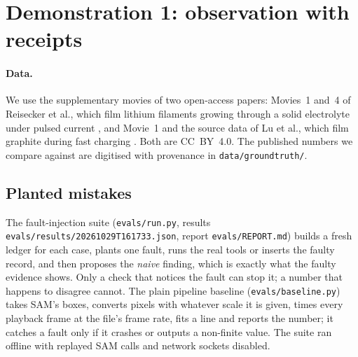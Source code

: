\documentclass[11pt]{article}
\newcommand{\cmd}[1]{\texttt{#1}}
\begin{document}
\section{Demonstration 1: observation with receipts}\label{sec:demo1}

\paragraph{Data.} We use the supplementary movies of two open-access papers: Movies~1 and~4 of Reisecker et al., which
film lithium filaments growing through a solid electrolyte under pulsed current \citep{reisecker2023dendrite}, and
Movie~1 and the source data of Lu et al., which film graphite during fast charging \citep{lu2023graphite}. Both are
CC~BY~4.0. The published numbers we compare against are digitised with provenance in \cmd{data/groundtruth/}.

\subsection{Planted mistakes}
The fault-injection suite (\cmd{evals/run.py}, results \cmd{evals/results/20261029T161733.json}, report
\cmd{evals/REPORT.md}) builds a fresh ledger for each case, plants one fault, runs the real tools or inserts the faulty
record, and then proposes the \emph{naive} finding, which is exactly what the faulty evidence shows. Only a check that
notices the fault can stop it; a number that happens to disagree cannot. The plain pipeline baseline
(\cmd{evals/baseline.py}) takes SAM's boxes, converts pixels with whatever scale it is given, times every playback
frame at the file's frame rate, fits a line and reports the number; it catches a fault only if it crashes or outputs
a non-finite value. The suite ran offline with replayed SAM calls and network sockets disabled.
\end{document}

